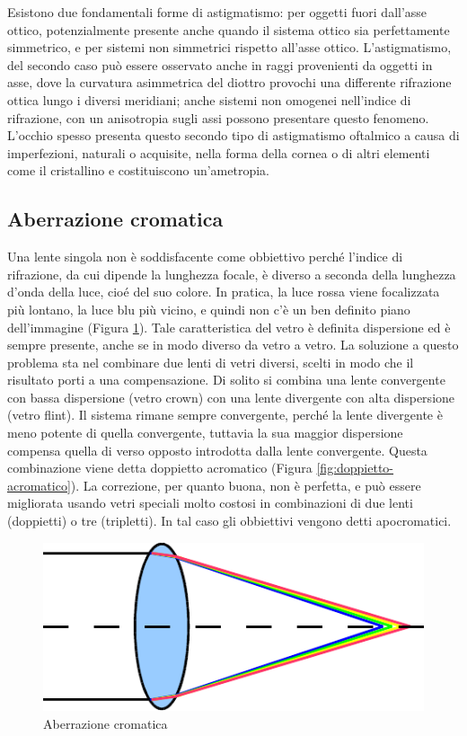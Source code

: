 Esistono due fondamentali forme di astigmatismo: per oggetti fuori dall'asse
ottico, potenzialmente presente anche quando il sistema ottico sia
perfettamente simmetrico, e per sistemi non simmetrici rispetto all'asse
ottico. L'astigmatismo, del secondo caso può essere osservato anche in raggi
provenienti da oggetti in asse, dove la curvatura asimmetrica del diottro
provochi una differente rifrazione ottica lungo i diversi meridiani; anche
sistemi non omogenei nell'indice di rifrazione, con un anisotropia sugli assi
possono presentare questo fenomeno. L'occhio spesso presenta questo secondo
tipo di astigmatismo oftalmico a causa di imperfezioni, naturali o acquisite,
nella forma della cornea o di altri elementi come il cristallino e
costituiscono un'ametropia.

\subsection{Aberrazione cromatica}

Una lente singola non è soddisfacente come obbiettivo perché l'indice di rifrazione, da
cui dipende la lunghezza focale, è diverso a seconda della lunghezza d'onda della luce, cioé del suo
colore. In pratica, la luce rossa viene focalizzata più lontano, la luce blu più vicino, e quindi non c'è
un ben definito piano dell'immagine (Figura \ref{fig:aberrazione-cromatica}). Tale caratteristica del vetro è definita dispersione
ed è sempre presente, anche se in modo diverso da vetro a vetro. La soluzione a questo problema sta
nel combinare due lenti di vetri diversi, scelti in modo che il risultato porti a una compensazione. Di solito si combina una lente convergente con bassa dispersione (vetro crown) con una lente divergente con alta dispersione (vetro flint). Il sistema rimane sempre convergente, perché la lente divergente è meno potente di quella convergente, tuttavia la sua maggior dispersione compensa quella di verso opposto introdotta dalla lente convergente. Questa combinazione viene detta doppietto acromatico (Figura \ref{fig:doppietto-acromatico}). La correzione, per quanto buona, non è perfetta, e può essere migliorata usando vetri speciali molto costosi in combinazioni di due lenti (doppietti) o tre (tripletti). In tal caso gli obbiettivi vengono detti apocromatici.



\begin{figure}

\centering
\includegraphics{img/aberrazione-cromatica.pdf}

\caption{Aberrazione cromatica}
\label{fig:aberrazione-cromatica}
\end{figure}


